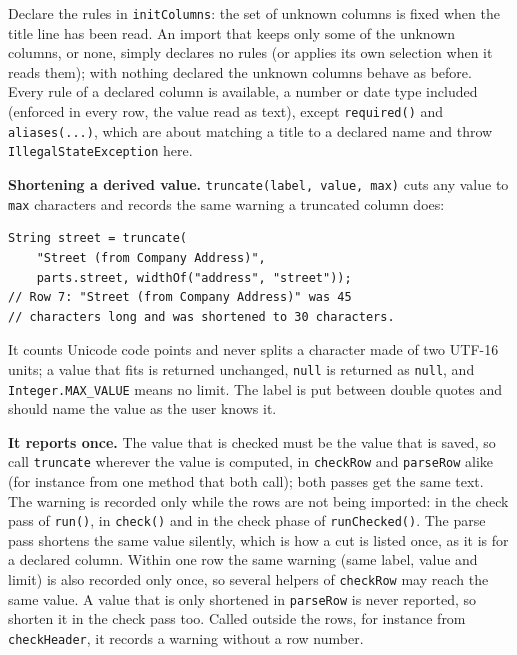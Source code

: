 Declare the rules in \texttt{initColumns}: the set of unknown columns is fixed when the title line has been read.  An import that keeps only some of the unknown columns, or none, simply declares no rules (or applies its own selection when it reads them); with nothing declared the unknown columns behave as before.  Every rule of a declared column is available, a number or date type included (enforced in every row, the value read as text), except \texttt{required()} and \texttt{aliases(...)}, which are about matching a title to a declared name and throw \texttt{IllegalStateException} here.

\textbf{Shortening a derived value.}  \texttt{truncate(label, value, max)} cuts any value to \texttt{max} characters and records the same warning a truncated column does:

\begin{lstlisting}[style=java]
String street = truncate(
    "Street (from Company Address)",
    parts.street, widthOf("address", "street"));
// Row 7: "Street (from Company Address)" was 45
// characters long and was shortened to 30 characters.
\end{lstlisting}

It counts Unicode code points and never splits a character made of two UTF-16 units; a value that fits is returned unchanged, \texttt{null} is returned as \texttt{null}, and \texttt{Integer.MAX\_VALUE} means no limit.  The label is put between double quotes and should name the value as the user knows it.

\textbf{It reports once.}  The value that is checked must be the value that is saved, so call \texttt{truncate} wherever the value is computed, in \texttt{checkRow} and \texttt{parseRow} alike (for instance from one method that both call); both passes get the same text.  The warning is recorded only while the rows are not being imported: in the check pass of \texttt{run()}, in \texttt{check()} and in the check phase of \texttt{runChecked()}.  The parse pass shortens the same value silently, which is how a cut is listed once, as it is for a declared column.  Within one row the same warning (same label, value and limit) is also recorded only once, so several helpers of \texttt{checkRow} may reach the same value.  A value that is only shortened in \texttt{parseRow} is never reported, so shorten it in the check pass too.  Called outside the rows, for instance from \texttt{checkHeader}, it records a warning without a row number.

